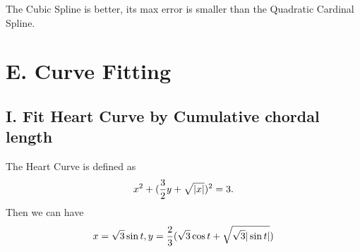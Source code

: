 \documentclass[a4paper]{article}
\begin{document}
The Cubic Spline is better, its max error is smaller than the Quadratic Cardinal Spline.


\section{E. Curve Fitting}

\subsection{I. Fit Heart Curve by Cumulative chordal length}

The Heart Curve is defined as
\begin{equation}
    x^2 + (\frac{3}{2} y + \sqrt{\abs{x}})^2 = 3.
\end{equation}
Then we can have 
\begin{equation}
    x = \sqrt{3} \sin t, \\ 
    y = \frac{2}{3} (\sqrt{3} \cos t + \sqrt{\sqrt{3} |\sin t|})
\end{equation}
\end{document}
